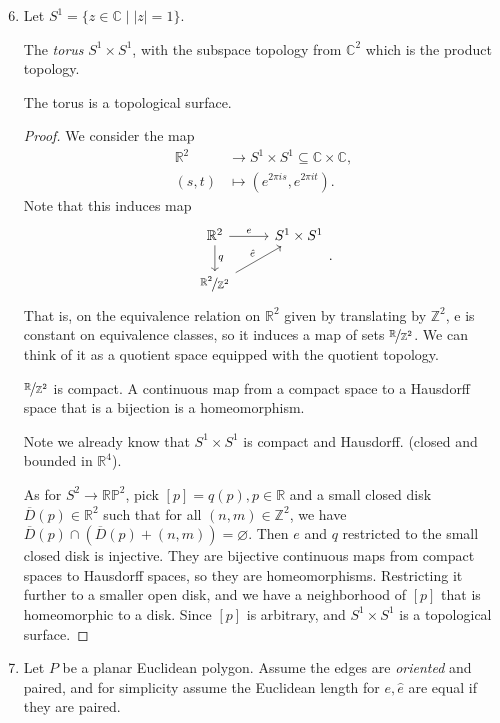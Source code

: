 \begin{enumerate}
    \setcounter{enumi}{5}
    \item Let \(S^1 = \{z \in \mathbb{C}\mid \left\vert z \right\vert =1\}\).
    
    The \textit{torus} \(S^1 \times S^1\), with the subspace topology from \(\mathbb{C}^2\) which is the product topology.
    \begin{lemma}
        The torus is a topological surface.
    \end{lemma}
    \begin{proof}
        We consider the map
        \begin{align*}
            \mathbb{R}^2 &\to S^1 \times S^1 \subseteq \mathbb{C}\times \mathbb{C},\\
            (s,t) &\mapsto (e^{2\pi is},e^{2\pi it}).
        \end{align*}
        Note that this induces map
        \[
            \begin{tikzcd}
                \mathbb{R}^2 \arrow[d,"q"] \arrow[r, "e"] & S^1\times S^1 \\ \nicefrac{\mathbb{R}^2}{\mathbb{Z}^2} \arrow[ru, "\hat{e}"]& 
            \end{tikzcd}.
        \]
        That is, on the equivalence relation on \(\mathbb{R}^2\) given by translating by \(\mathbb{Z}^2\), e is constant on equivalence classes, so it induces a map of sets \(\nicefrac{\mathbb{R}}{\mathbb{Z}^2}\). We can think of it as a quotient space equipped with the quotient topology.

        \(\nicefrac{\mathbb{R}}{\mathbb{Z}^2}\) is compact. A continuous map from a compact space to a Hausdorff space that is a bijection is a homeomorphism.

        Note we already know that \(S^1 \times S^1\) is compact and Hausdorff. (closed and bounded in \(\mathbb{R}^4\)).

        As for \(S^2 \to \mathbb{RP}^2\), pick \([p] = q(p), p \in \mathbb{R}\) and a small closed disk \(\overline{D}(p)\in \mathbb{R}^2\) such that for all \((n,m)\in \mathbb{Z}^2\), we have \(\overline{D}(p)\cap (\overline{D}(p) + (n,m))=\varnothing \). Then \(e\) and \(q\) restricted to the small closed disk is injective. They are bijective continuous maps from compact spaces to Hausdorff spaces, so they are homeomorphisms. Restricting it further to a smaller open disk, and we have a neighborhood of \([p]\) that is homeomorphic to a disk. Since \([p]\) is arbitrary, and \(S^1 \times S^1\) is a topological surface.
    \end{proof}
    \item Let \(P\) be a planar Euclidean polygon. Assume the edges are \textit{oriented} and paired, and for simplicity assume the Euclidean length for \(e, \hat{e}\) are equal if they are paired.


\end{enumerate}
